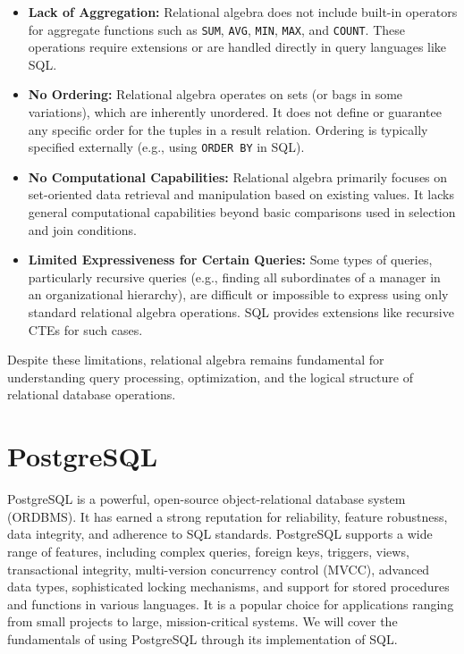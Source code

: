 \documentclass[12pt]{book}
\begin{document}
\begin{itemize}
    \item \textbf{Lack of Aggregation:} Relational algebra does not include built-in operators for aggregate functions such as \texttt{SUM}, \texttt{AVG}, \texttt{MIN}, \texttt{MAX}, and \texttt{COUNT}. These operations require extensions or are handled directly in query languages like SQL.
    \item \textbf{No Ordering:} Relational algebra operates on sets (or bags in some variations), which are inherently unordered. It does not define or guarantee any specific order for the tuples in a result relation. Ordering is typically specified externally (e.g., using \texttt{ORDER BY} in SQL).
    \item \textbf{No Computational Capabilities:} Relational algebra primarily focuses on set-oriented data retrieval and manipulation based on existing values. It lacks general computational capabilities beyond basic comparisons used in selection and join conditions.
    \item \textbf{Limited Expressiveness for Certain Queries:} Some types of queries, particularly recursive queries (e.g., finding all subordinates of a manager in an organizational hierarchy), are difficult or impossible to express using only standard relational algebra operations. SQL provides extensions like recursive CTEs for such cases.
\end{itemize}

Despite these limitations, relational algebra remains fundamental for understanding query processing, optimization, and the logical structure of relational database operations.

\chapter{PostgreSQL}

PostgreSQL is a powerful, open-source object-relational database system (ORDBMS). It has earned a strong reputation for reliability, feature robustness, data integrity, and adherence to SQL standards. PostgreSQL supports a wide range of features, including complex queries, foreign keys, triggers, views, transactional integrity, multi-version concurrency control (MVCC), advanced data types, sophisticated locking mechanisms, and support for stored procedures and functions in various languages. It is a popular choice for applications ranging from small projects to large, mission-critical systems. We will cover the fundamentals of using PostgreSQL through its implementation of SQL.
\end{document}

